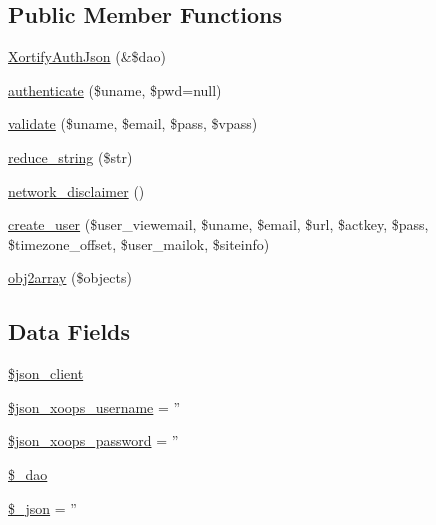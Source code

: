 \subsection*{Public Member Functions}
\begin{DoxyCompactItemize}
\item 
\hyperlink{class_xortify_auth_json_af9cea820589b04eda07f0170290d81ae}{Xortify\-Auth\-Json} (\&\$dao)
\item 
\hyperlink{class_xortify_auth_json_a00678ba307326b734e6c679f28bea315}{authenticate} (\$uname, \$pwd=null)
\item 
\hyperlink{class_xortify_auth_json_a91121a1b702dfd20fb65a027c8ed26ec}{validate} (\$uname, \$email, \$pass, \$vpass)
\item 
\hyperlink{class_xortify_auth_json_ae463a3baa44e95fa5b5151ab2334df1c}{reduce\-\_\-string} (\$str)
\item 
\hyperlink{class_xortify_auth_json_a1874c27b6f81a3f2ff9015405ad0f8bc}{network\-\_\-disclaimer} ()
\item 
\hyperlink{class_xortify_auth_json_ac72efc5ad313a592cf6706876f56f7ec}{create\-\_\-user} (\$user\-\_\-viewemail, \$uname, \$email, \$url, \$actkey, \$pass, \$timezone\-\_\-offset, \$user\-\_\-mailok, \$siteinfo)
\item 
\hyperlink{class_xortify_auth_json_aabc52e4f78557f0e0b360a8aaba6e11d}{obj2array} (\$objects)
\end{DoxyCompactItemize}
\subsection*{Data Fields}
\begin{DoxyCompactItemize}
\item 
\hyperlink{class_xortify_auth_json_a2d091f9d959cab9ac28ad2cc96149447}{\$json\-\_\-client}
\item 
\hyperlink{class_xortify_auth_json_ac058687d82a56fb93513e7e58c4ec391}{\$json\-\_\-xoops\-\_\-username} = ''
\item 
\hyperlink{class_xortify_auth_json_a7af311f07c1c09254920e6ac0cefe9a9}{\$json\-\_\-xoops\-\_\-password} = ''
\item 
\hyperlink{class_xortify_auth_json_a12a029c610f699b4b25e79a1f64a3485}{\$\-\_\-dao}
\item 
\hyperlink{class_xortify_auth_json_a94787b37d92a2dee02534eed4f316589}{\$\-\_\-json} = ''
\end{DoxyCompactItemize}


